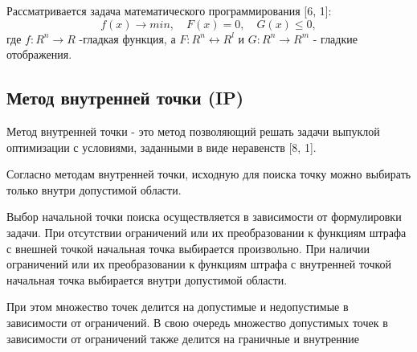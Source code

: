 \documentclass[12pt,a4paper]{article}
\begin{document}
	Рассматривается задача математического программирования [6, 1]:
	\begin{equation}\label{eq:0}
		f(x) \longrightarrow min, \quad F(x) = 0,\quad G(x) \leq 0,
	\end{equation}
где $f:R^n \longrightarrow R$ -гладкая функция, а $F:R^n \longleftrightarrow R^l$ и $G:R^n \longrightarrow R^m$ - гладкие отображения.
\subsection{Метод внутренней точки (IP)}
Метод внутренней точки - это метод позволяющий решать задачи выпуклой оптимизации с условиями, заданными в виде неравенств [8, 1].
	
Согласно методам внутренней точки, исходную для поиска точку можно выбирать только внутри допустимой области.
	
Выбор начальной точки поиска осуществляется в зависимости от формулировки задачи. При отсутствии ограничений или их преобразовании к функциям штрафа с внешней точкой начальная точка выбирается произвольно. При наличии ограничений или их преобразовании к функциям штрафа с внутренней точкой начальная точка выбирается внутри допустимой области.

При этом множество точек делится на допустимые и недопустимые в зависимости от ограничений. В свою очередь множество допустимых точек в зависимости от ограничений также делится на граничные и внутренние
	
\end{document}
